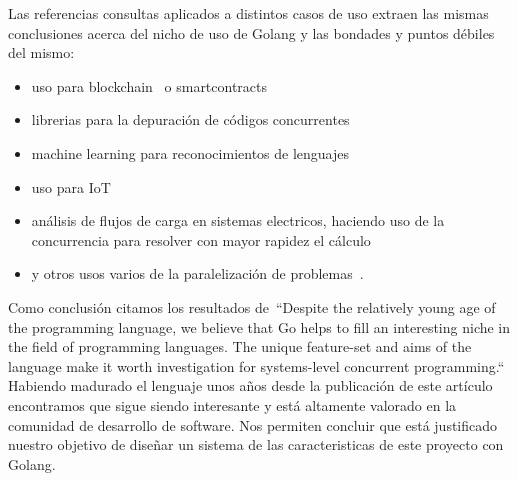Las referencias consultas aplicados a distintos casos de uso extraen las mismas conclusiones acerca del nicho de uso de Golang y las bondades y puntos débiles del mismo:

\begin{itemize}
	\item uso para blockchain~\cite{Ray202110857} o smartcontracts~\cite{Ding2021321}
	\item librerias para la depuración de códigos concurrentes~\cite{Taheri2021138}
	\item machine learning para reconocimientos de lenguajes~\cite{NoAuthor2021179,Dilley2019377}
	\item uso para IoT ~\cite{Samaniego2017116}
	\item análisis de flujos de carga en sistemas electricos, haciendo uso de la concurrencia para resolver con mayor rapidez el cálculo~\cite{Khaitan20152909}
	\item y otros usos varios de la paralelización de problemas~\cite{Qiu2018,Shoumik20181,Mladenovic2018,Benedict2017437,Irawan2017,Leokhin2015656,Komendantskaya2014121,Mittal2014292}.
\end{itemize}

Como conclusión citamos los resultados de~\cite{WhiteheadII2011209}“Despite the relatively young age of the programming language, we believe that Go helps to fill an interesting niche in the field of programming languages.
The unique feature-set and aims of the language make it worth investigation for systems-level concurrent programming.“ Habiendo madurado el lenguaje unos años desde la publicación de este artículo encontramos que sigue siendo interesante y está altamente valorado en la comunidad de desarrollo de software.
Nos permiten concluir que está justificado nuestro objetivo de diseñar un sistema de las caracteristicas de este proyecto con Golang.

